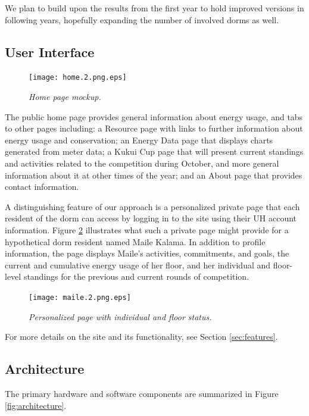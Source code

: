 \documentclass[11pt]{article}
\begin{document}
We plan to build upon the results from the first year to hold improved
versions in following years, hopefully expanding the number of involved
dorms as well. 

\subsection{User Interface}
\label{sec:userinterface}

\begin{figure}[!ht]
  \center
  \texttt{[image: home.2.png.eps]}
  \caption{\em \small Home page mockup.}
 \label{fig:homepage}
\end{figure} 

The public home page provides general information about energy usage, and
tabs to other pages including: a Resource page with links to further
information about energy usage and conservation; an Energy Data page that
displays charts generated from meter data; a Kukui Cup page that will
present current standings and activities related to the competition during
October, and more general information about it at other times of the year;
and an About page that provides contact information.

A distinguishing feature of our approach is a personalized private page that each
resident of the dorm can access by logging in to the site using their UH
account information.  Figure \ref{fig:mailepage} illustrates what such a
private page might provide for a hypothetical dorm resident named Maile Kalama.  In
addition to profile information, the page displays Maile's activities,
commitments, and goals, the current and cumulative energy usage of her
floor, and her individual and floor-level standings for the previous and
current rounds of competition.

\begin{figure}[!ht]
  \center
  \texttt{[image: maile.2.png.eps]}
  \caption{\em \small Personalized page with individual and floor status.}
 \label{fig:mailepage}
\end{figure} 

For more details on the site and its functionality, see Section \ref{sec:features}.

\subsection{Architecture}

The primary hardware and software components are summarized in Figure \ref{fig:architecture}.
\end{document}
